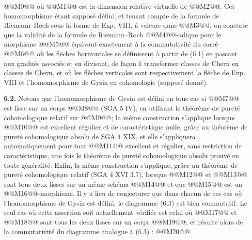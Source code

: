
@@M0@@
où @@M1@@ est la
dimension relative virtuelle de @@M2@@. Cet homomorphisme étant supposé défini, et tenant compte de la formule de Riemann--Roch sous la forme de Exp. VIII, à valeurs dans @@M3@@, on constate que la validité de la formule de Riemann--Roch @@M4@@-adique pour le morphisme @@M5@@ équivaut exactement à la commutativité du carré
@@M6@@
où les flèches horizontales se définissent à partir de (6.1) en passant aux gradués associés et en divisant, de façon à transformer classes de Chern en classes de Chern, et où les flèches verticales sont respectivement la flèche de Exp. VIII et l'homomorphisme de Gysin en cohomologie (supposé donné).

\textbf{6.2.} Notons que l'homomorphisme de Gysin est défini en tous cas si @@M7@@ est lisse sur un corps @@M8@@ (SGA 5 IV), en utilisant le théorème de pureté cohomologique relatif sur @@M9@@; la même construction s'applique lorsque @@M10@@ est excellent régulier et de caractéristique nulle, grâce au théorème de pureté cohomologique absolu de SGA 4 XIX, et elle s'appliquera automatiquement pour tout @@M11@@ excellent et régulier, sans restriction de caractéristique, une fois le théorème de pureté cohomologique absolu prouvé en toute généralité. Enfin, la même construction s'applique, grâce au théorème de pureté cohomologique relatif (SGA 4 XVI 3.7), lorsque @@M12@@ et @@M13@@ sont tous deux lisses sur un même schéma @@M14@@ et que @@M15@@ est un @@M16@@-morphisme. Il y a lieu de conjecturer que dans chacun de ces cas où l'homomorphisme de Gysin est défini, le diagramme (6.3) est bien commutatif. Le seul cas où cette assertion soit actuellement vérifiée est celui où @@M17@@ et @@M18@@ sont tous les deux lisses sur un corps @@M19@@, et résulte alors de la commutativité du diagramme analogue à (6.3) :
@@M20@@
